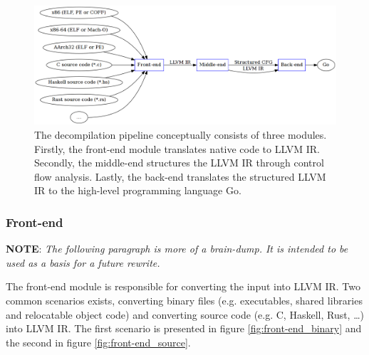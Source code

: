 
\begin{figure}[htbp]
	\begin{center}
		\includegraphics[width=\textwidth]{inc/decompilation_pipeline.png}
		\caption{The decompilation pipeline conceptually consists of three modules. Firstly, the front-end module translates native code to LLVM IR. Secondly, the middle-end structures the LLVM IR through control flow analysis. Lastly, the back-end translates the structured LLVM IR to the high-level programming language Go.}
		\label{fig:decompilation_pipeline}
	\end{center}
\end{figure}


\subsubsection{Front-end}


\textbf{NOTE}: \textit{The following paragraph is more of a brain-dump. It is intended to be used as a basis for a future rewrite.}

The front-end module is responsible for converting the input into LLVM IR. Two common scenarios exists, converting binary files (e.g. executables, shared libraries and relocatable object code) and converting source code (e.g. C, Haskell, Rust, …) into LLVM IR. The first scenario is presented in figure \ref{fig:front-end_binary} and the second in figure \ref{fig:front-end_source}.


